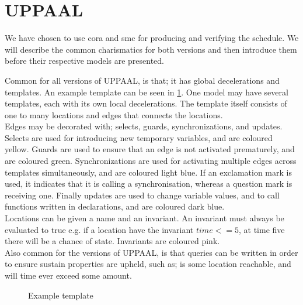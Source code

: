\section{UPPAAL} \label{sec:uppaal}
We have chosen to use \acrlong{cora}\cite{cs_cora}\cite{cora_tutorial} and \acrlong{smc}\cite{smc_home}\cite{cs_smc} for producing and verifying the schedule. We will describe the common charismatics for both versions and then introduce them before their respective models are presented.

Common for all versions of UPPAAL, is that; it has global decelerations and templates. 
An example template can be seen in \cref{fig:uppaal_eksample}.
One model may have several templates, each with its own local decelerations. The template itself consists of one to many locations and edges that connects the locations.\\
Edges may be decorated with; selects, guards, synchronizations, and updates. 
Selects are used for introducing new temporary variables, and are coloured yellow.
Guards are used to ensure that an edge is not activated prematurely, and are coloured green.
Synchronizations are used for activating multiple edges across templates simultaneously, and are coloured light blue. If an exclamation mark is used, it indicates that it is calling a synchronisation, whereas a question mark is receiving one.
Finally updates are used to change variable values, and to call functions written in declarations, and are coloured dark blue.\\
Locations can be given a name and an invariant. An invariant must always be evaluated to true e.g. if a location have the invariant $time <= 5$, at time five there will be a chance of state. Invariants are coloured pink.\\
Also common for the versions of UPPAAL, is that queries can be written in order to ensure sustain properties are upheld, such as; is some location reachable, and will time ever exceed some amount.
\begin{figure}[h]
   \centering
   \caption{Example template}
   \label{fig:uppaal_eksample}
\end{figure}
